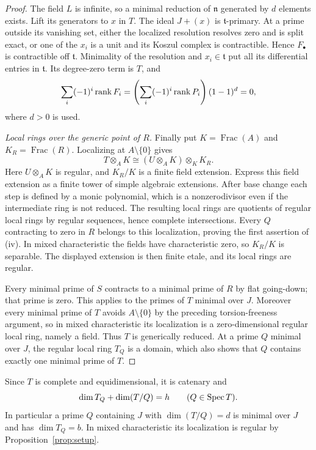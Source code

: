 \begin{proof}
The field $L$ is infinite, so a minimal reduction of $\mathfrak n$
generated by $d$ elements exists.  Lift its generators to $x$ in $T$.
The ideal $J+(x)$ is $\mathfrak t$-primary.  At a prime outside its
vanishing set, either the localized resolution resolves zero and is
split exact, or one of the $x_i$ is a unit and its Koszul complex is
contractible.  Hence $F_\bullet$ is contractible off $\mathfrak t$.
Minimality of the resolution and $x_i\in\mathfrak t$ put all its
differential entries in $\mathfrak t$.  Its degree-zero term is $T$,
and
\[
  \sum_i(-1)^i\operatorname{rank} F_i
    =\left(\sum_i(-1)^i\operatorname{rank} P_i\right)(1-1)^d=0,
\]
where $d>0$ is used.

\smallskip
\noindent\emph{Local rings over the generic point of $R$.}
Finally put $K=\operatorname{Frac}(A)$ and
$K_R=\operatorname{Frac}(R)$.  Localizing at $A\setminus\{0\}$ gives
\[
 T\otimes_A K
   \cong (U\otimes_A K)\otimes_K K_R.
\]
Here $U\otimes_A K$ is regular, and $K_R/K$ is a finite field
extension.  Express this field extension as a finite tower of simple
algebraic extensions.  After base change each step is defined by a
monic polynomial, which is a nonzerodivisor even if the intermediate
ring is not reduced.  The resulting local rings are quotients of
regular local rings by regular sequences, hence complete
intersections.  Every $Q$ contracting to zero in $R$ belongs to this
localization, proving the first assertion of (iv).  In mixed
characteristic the fields have characteristic zero, so $K_R/K$ is
separable.  The displayed extension is then finite etale, and its
local rings are regular.

Every minimal prime of $S$ contracts to a minimal prime of $R$ by
flat going-down; that prime is zero.  This applies to the primes of
$T$ minimal over $J$.  Moreover every minimal prime of $T$ avoids
$A\setminus\{0\}$ by the preceding torsion-freeness argument, so in
mixed characteristic its localization is a zero-dimensional regular
local ring, namely a field.  Thus $T$ is generically reduced.  At a
prime $Q$ minimal over $J$, the regular local ring $T_Q$ is a domain,
which also shows that $Q$ contains exactly one minimal prime of $T$.
\end{proof}

\begin{remark}\label{rem:setup-dimensions}
Since $T$ is complete and equidimensional, it is catenary and
\[
  \dim T_Q+\dim(T/Q)=h\qquad(Q\in\operatorname{Spec} T).
\]
In particular a prime $Q$ containing $J$ with $\dim(T/Q)=d$ is minimal
over $J$ and has $\dim T_Q=b$.  In mixed characteristic its
localization is regular by Proposition~\ref{prop:setup}.
\end{remark}
